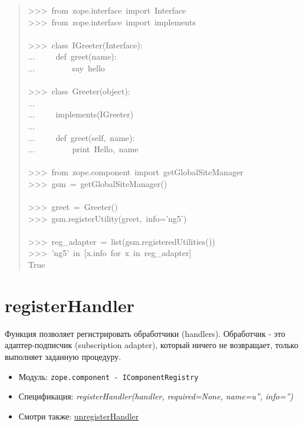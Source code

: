 \documentclass[a4paper,openany,twoside,final]{book}
\providecommand*{\DUroletitlereference}[1]{\textsl{#1}}
\begin{document}
\begin{quote}{\ttfamily \raggedright \noindent
>{}>{}>~from~zope.interface~import~Interface\\
>{}>{}>~from~zope.interface~import~implements\\
~\\
>{}>{}>~class~IGreeter(Interface):\\
...~~~~~def~greet(name):\\
...~~~~~~~~~\textquotedbl{}say~hello\textquotedbl{}\\
~\\
>{}>{}>~class~Greeter(object):\\
...\\
...~~~~~implements(IGreeter)\\
...\\
...~~~~~def~greet(self,~name):\\
...~~~~~~~~~print~\textquotedbl{}Hello\textquotedbl{},~name\\
~\\
>{}>{}>~from~zope.component~import~getGlobalSiteManager\\
>{}>{}>~gsm~=~getGlobalSiteManager()\\
~\\
>{}>{}>~greet~=~Greeter()\\
>{}>{}>~gsm.registerUtility(greet,~info='ng5')\\
~\\
>{}>{}>~reg\_adapter~=~list(gsm.registeredUtilities())\\
>{}>{}>~'ng5'~in~{[}x.info~for~x~in~reg\_adapter{]}\\
True
}
\end{quote}


\section*{registerHandler%
  \label{registerhandler}%
}

Функция позволяет регистрировать обработчики (handlers). Обработчик -
это адаптер-подписчик (subscription adapter), который ничего не
возвращает, только выполняет заданную процедуру.

\begin{itemize}

\item Модуль: \texttt{zope.component - IComponentRegistry}

\item Спецификация: \DUroletitlereference{registerHandler(handler, required=None, name=u'', info='')}

\item Смотри также: \hyperref[unregisterhandler]{unregisterHandler}

\end{itemize}
\end{document}
